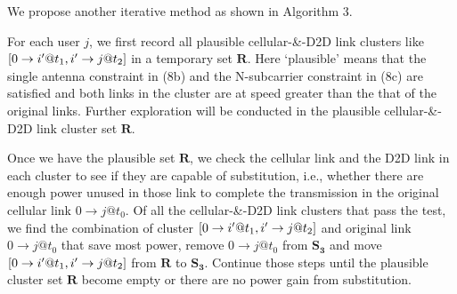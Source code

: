 \documentclass{ieeeaccess}
\begin{document}
We propose another iterative method as shown in Algorithm 3. 


For each user $j$, we first record all plausible cellular-\&-D2D link clusters like $\left[ {{\rm{0}} \to i'@{t_1},i' \to j@{t_2}} \right]$ in a temporary set $\mathbf{R}$. Here `plausible' means that the single antenna constraint in (8b) and the N-subcarrier constraint in (8c) are satisfied and both links in the cluster are at speed greater than the that of the original links. Further exploration will be conducted in the plausible cellular-\&-D2D link cluster set $\mathbf{R}$.

Once we have the plausible set $\mathbf{R}$, we check the cellular link and the D2D link in each cluster to see if they are capable of substitution, i.e., whether there are enough power unused in those link to complete the transmission in the original cellular link $0 \to j @{t_0}$. Of all the cellular-\&-D2D link clusters that pass the test, we find the combination of cluster $\left[ {{\rm{0}} \to i'@{t_1},i' \to j@{t_2}} \right]$ and original link $0 \to j @{t_0}$ that save most power, remove $0 \to j @{t_0}$ from ${{\mathbf{S}}_{\mathbf{3}}}$ and move $\left[ {{\rm{0}} \to i'@{t_1},i' \to j@{t_2}} \right]$ from $\mathbf{R}$ to ${{\mathbf{S}}_{\mathbf{3}}}$. Continue those steps until the plausible cluster set $\mathbf{R}$ become empty or there are no power gain from substitution.
\end{document}
